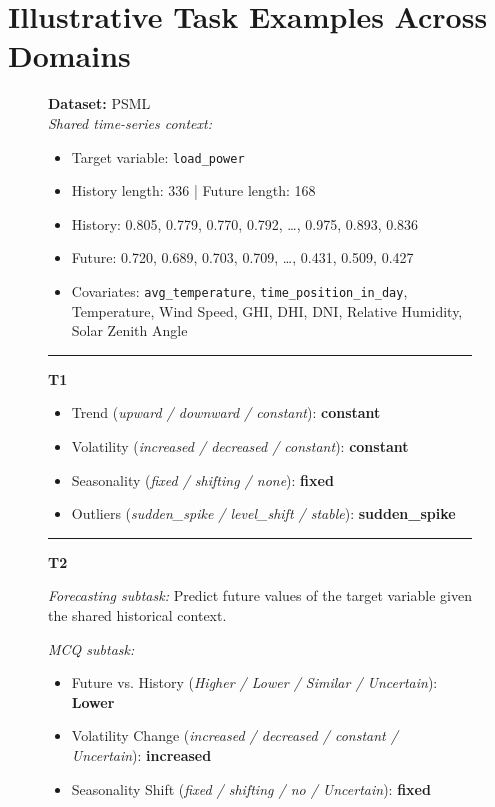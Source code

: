 \section{Illustrative Task Examples Across Domains}
\begin{figure}[htbp]
\centering
\begin{tcolorbox}[
  colback=gray!6,
  colframe=black!20,
  boxrule=0.5pt,
  arc=3pt,
  left=6pt,right=6pt,top=6pt,bottom=6pt
]
\textbf{Dataset:} PSML \\

\emph{Shared time-series context:}
\begin{itemize}[leftmargin=1.1em,itemsep=0pt,topsep=0pt,parsep=0pt,partopsep=0pt]
  \item Target variable: \texttt{load\_power}
  \item History length: 336 \quad | \quad Future length: 168
  \item History: 0.805, 0.779, 0.770, 0.792, \ldots, 0.975, 0.893, 0.836
  \item Future: 0.720, 0.689, 0.703, 0.709, \ldots, 0.431, 0.509, 0.427
  \item Covariates:
  \texttt{avg\_temperature}, \texttt{time\_position\_in\_day},
  Temperature, Wind Speed, GHI, DHI, DNI,
  Relative Humidity, Solar Zenith Angle
\end{itemize}

\hrule\vspace{4pt}

\textbf{T1}
\begin{itemize}[leftmargin=1.1em,itemsep=0pt,topsep=0pt,parsep=0pt,partopsep=0pt]
  \item Trend (\textit{upward / downward / constant}): \textbf{constant}
  \item Volatility (\textit{increased / decreased / constant}): \textbf{constant}
  \item Seasonality (\textit{fixed / shifting / none}): \textbf{fixed}
  \item Outliers (\textit{sudden\_spike / level\_shift / stable}): \textbf{sudden\_spike}
\end{itemize}

\vspace{3pt}\hrule\vspace{4pt}

\textbf{T2}

\emph{Forecasting subtask:}
Predict future values of the target variable given the shared historical context.

\emph{MCQ subtask:}
\begin{itemize}[leftmargin=1.1em,itemsep=0pt,topsep=0pt,parsep=0pt,partopsep=0pt]
  \item Future vs. History
  (\textit{Higher / Lower / Similar / Uncertain}): \textbf{Lower}
  \item Volatility Change
  (\textit{increased / decreased / constant / Uncertain}): \textbf{increased}
  \item Seasonality Shift
  (\textit{fixed / shifting / no / Uncertain}): \textbf{fixed}
\end{itemize}


\end{tcolorbox}
\end{figure}
